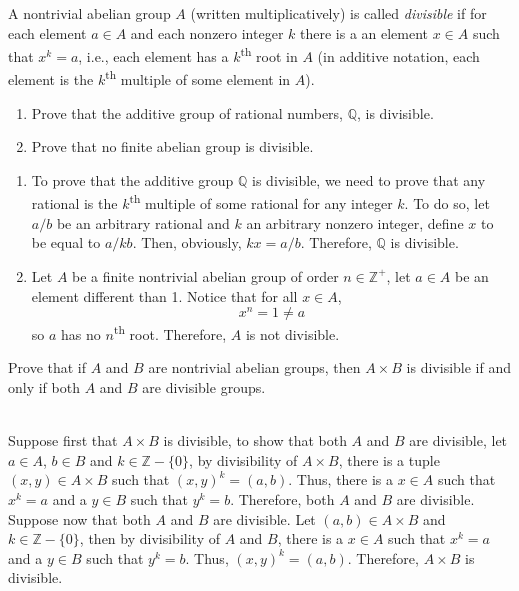 \begin{exercise}
    A nontrivial abelian group $A$ (written multiplicatively) is called \textit{divisible} if for each element $a \in A$ and each nonzero integer $k$ there is a an element $x \in A$ such that $x^k = a$, i.e., each element has a $k$\textsuperscript{th} root in $A$ (in additive notation, each element is the $k$\textsuperscript{th} multiple of some element in $A$).
    \begin{enumerate}[label = \textbf{(\alph*)}]
        \item Prove that the additive group of rational numbers, $\mathbb{Q}$, is divisible.
        \item Prove that no finite abelian group is divisible. \\ 
    \end{enumerate}
\end{exercise}

\begin{solution}
    \begin{enumerate}[label = \textbf{(\alph*)}]
        \item To prove that the additive group $\mathbb{Q}$ is divisible, we need to prove that any rational is the $k$\textsuperscript{th} multiple of some rational for any integer $k$. To do so, let $a/b$ be an arbitrary rational and $k$ an arbitrary nonzero integer, define $x$ to be equal to $a/kb$. Then, obviously, $kx = a/b$. Therefore, $\mathbb{Q}$ is divisible.
        \item Let $A$ be a finite nontrivial abelian group of order $n \in \mathbb{Z}^+$, let $a \in A$ be an element different than 1. Notice that for all $x \in A$,
        $$x^n = 1 \neq a$$
        so $a$ has no $n$\textsuperscript{th} root. Therefore, $A$ is not divisible. \\
    \end{enumerate}
\end{solution}

\begin{exercise}
    Prove that if $A$ and $B$ are nontrivial abelian groups, then $A \times B$ is divisible if and only if both $A$ and $B$ are divisible groups. \\
\end{exercise}

\begin{solution}
    \\ Suppose first that $A \times B$ is divisible, to show that both $A$ and $B$ are divisible, let $a \in A$, $b \in B$ and $k \in \mathbb{Z} - \{0\}$, by divisibility of $A \times B$, there is a tuple $(x,y) \in A \times B$ such that $(x,y)^k = (a,b)$. Thus, there is a $x \in A$ such that $x^k = a$ and a $y \in B$ such that $y^k = b$. Therefore, both $A$ and $B$ are divisible. \\
    Suppose now that both $A$ and $B$ are divisible. Let $(a,b) \in A\times B$ and $k \in \mathbb{Z} - \{0\}$, then by divisibility of $A$ and $B$, there is a $x \in A$ such that $x^k = a$ and a $y \in B$ such that $y^k = b$. Thus, $(x,y)^k = (a,b)$. Therefore, $A \times B$ is divisible.
\end{solution}